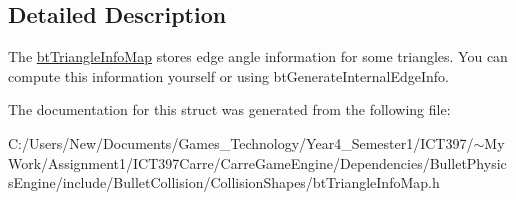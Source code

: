 \subsection{Detailed Description}
The \hyperlink{structbt_triangle_info_map}{btTriangleInfoMap} stores edge angle information for some triangles. You can compute this information yourself or using btGenerateInternalEdgeInfo. 

The documentation for this struct was generated from the following file:\begin{CompactItemize}
\item 
C:/Users/New/Documents/Games\_\-Technology/Year4\_\-Semester1/ICT397/$\sim$My Work/Assignment1/ICT397Carre/CarreGameEngine/Dependencies/BulletPhysicsEngine/include/BulletCollision/CollisionShapes/btTriangleInfoMap.h\end{CompactItemize}
